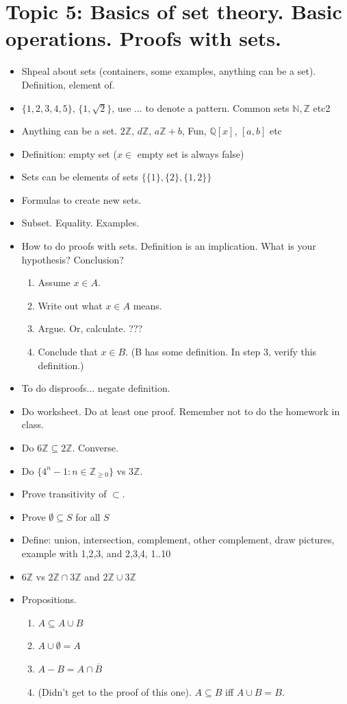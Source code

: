 \documentclass[12pt]{article}
\newcommand{\N}{{\mathbb N}}
\newcommand{\Z}{{\mathbb Z}}
\newcommand{\Q}{{\mathbb Q}}
\begin{document}
\newpage
\section[5 (\csname dateWeek5\endcsname): Basics of set theory. Basic operations. Proofs with sets.]{Topic  5: Basics of set theory. Basic operations. Proofs with sets.}


\begin{itemize}
\item Shpeal about sets (containers, some examples, anything can be a set). Definition, element of.
\item $\{1,2,3,4,5\}$, $\{1,\sqrt{2}\}$, use $\dots$ to denote a pattern. Common sets $\N, \Z$ etc2
\item Anything can be a set. $2\Z$, $d\Z$, $a\Z + b$, Fun, $\Q[x]$,  $[a,b]$ etc
\item Definition: empty set ($x \in $ empty set is always false)
\item Sets can be elements of sets $\{\{1\}, \{2\}, \{1,2\}\}$
\item Formulas to create new sets. 
\item Subset. Equality. Examples. 
\item How to do proofs with sets.  Definition is an implication. What is your hypothesis? Conclusion? 
  \begin{enumerate}
  \item Assume $x \in A$.
  \item Write out what $x \in A$ means.
  \item Argue. Or, calculate. ???
  \item Conclude that $x \in B$. (B has some definition. In step 3, verify this definition.)
  \end{enumerate}
\item To do disproofs... negate definition.
\item Do worksheet. Do at least one proof. Remember not to do the homework in class.
\item Do $6\Z \subseteq 2\Z$. Converse.
\item Do $\{4^n - 1 : n \in \Z_{\geq 0}\}$ vs $3\Z$.
\item Prove transitivity of $\subset$. 
\item Prove $\emptyset \subseteq S$ for all $S$



\item Define: union, intersection, complement, other complement, draw pictures, example with 1,2,3, and 2,3,4, 1..10
\item $6\Z$ vs $2\Z \cap 3\Z$ and $2\Z \cup 3\Z$ 
\item Propositions.
  \begin{enumerate}
  \item $A \subseteq A \cup B$
  \item $A \cup \emptyset = A$
  \item $A - B = A \cap \overline{B}$
  \item (Didn't get to the proof of this one). $A \subseteq B$ iff $A \cup B = B$.
  \end{enumerate}
\end{itemize}
\end{document}
